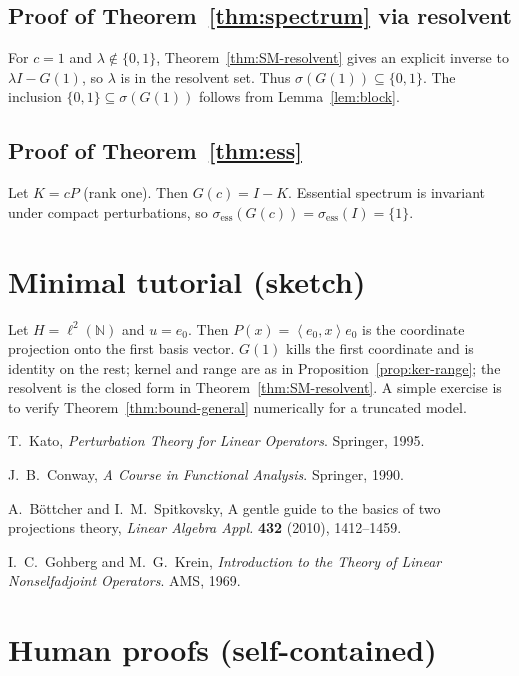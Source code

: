\documentclass[11pt]{article}
\theoremstyle{definition}
\newcommand{\ip}[2]{\left\langle #1,#2\right\rangle}
\begin{document}
\subsection*{Proof of Theorem~\ref{thm:spectrum} via resolvent}
For $c=1$ and $\lambda\notin\{0,1\}$, Theorem~\ref{thm:SM-resolvent} gives an explicit inverse to $\lambda I - G(1)$, so $\lambda$ is in the resolvent set. Thus $\sigma(G(1))\subseteq\{0,1\}$. The inclusion $\{0,1\}\subseteq\sigma(G(1))$ follows from Lemma~\ref{lem:block}.

\subsection*{Proof of Theorem~\ref{thm:ess}}
Let $K=cP$ (rank one). Then $G(c)=I-K$. Essential spectrum is invariant under compact perturbations, so $\sigma_{\mathrm{ess}}(G(c))=\sigma_{\mathrm{ess}}(I)=\{1\}$.

\section{Minimal tutorial (sketch)}

Let $H=\ell^2(\mathbb{N})$ and $u=e_0$. Then $P(x)=\ip{e_0}{x}e_0$ is the coordinate projection onto the first basis vector. $G(1)$ kills the first coordinate and is identity on the rest; kernel and range are as in Proposition~\ref{prop:ker-range}; the resolvent is the closed form in Theorem~\ref{thm:SM-resolvent}. A simple exercise is to verify Theorem~\ref{thm:bound-general} numerically for a truncated model.

\begin{thebibliography}{9}

T.~Kato, \emph{Perturbation Theory for Linear Operators}. Springer, 1995.

J.~B.~Conway, \emph{A Course in Functional Analysis}. Springer, 1990.

A.~B{\"o}ttcher and I.~M.~Spitkovsky, A gentle guide to the basics of two projections theory,
\emph{Linear Algebra Appl.} \textbf{432} (2010), 1412--1459.

I.~C.~Gohberg and M.~G.~Krein, \emph{Introduction to the Theory of Linear Nonselfadjoint Operators}. AMS, 1969.

\end{thebibliography}


\appendix
\section{Human proofs (self-contained)}\label{sec:human-proofs}
\end{document}
